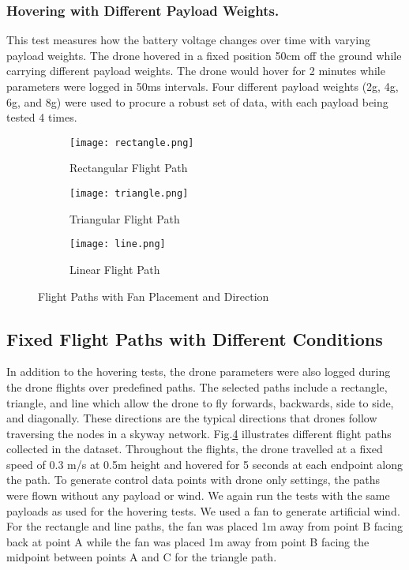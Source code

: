 \documentclass[runningheads]{llncs}
\begin{document}
\subsubsection{Hovering with Different Payload Weights.}
This test measures how the battery voltage changes over time with varying payload weights. The drone hovered in a fixed position 50cm off the ground while carrying different payload weights. The drone would hover for 2 minutes while parameters were logged in 50ms intervals. Four different payload weights (2g, 4g, 6g, and 8g) were used to procure a robust set of data, with each payload being tested 4 times.
\begin{figure}[t]
  \begin{subfigure}[t]{0.32\textwidth}
    \texttt{[image: rectangle.png]}
    \vspace{-0.4 cm}
   \caption{Rectangular Flight Path}\label{rectangle-diagram}
  \end{subfigure}\hfill
  \begin{subfigure}[t]{0.32\textwidth}
    \texttt{[image: triangle.png]}
    
   \caption{Triangular Flight Path}\label{triangle-diagram}
  \end{subfigure}
  \begin{subfigure}[t]{0.32\textwidth}
    \texttt{[image: line.png]}
    \vspace{-0.4 cm}
    \caption{Linear Flight Path}\label{line-diagram}
  \end{subfigure}
    \vspace{-0.2 cm}
  \caption{Flight Paths with Fan Placement and Direction}
  \label{fig:paths}
\vspace{-0.3 cm}
\end{figure}
\vspace{-0.2 cm}
\subsection{Fixed Flight Paths with Different Conditions}
\vspace{-0.1 cm}
In addition to the hovering tests, the drone parameters were also logged during the drone flights over predefined paths. The selected paths include a rectangle, triangle, and line which allow the drone to fly forwards, backwards, side to side, and diagonally. These directions are the typical directions that drones follow traversing the nodes in a skyway network. Fig.\ref{fig:paths} illustrates different flight paths collected in the dataset. Throughout the flights, the drone travelled at a fixed speed of 0.3 m/s at 0.5m height and hovered for 5 seconds at each endpoint along the path. To generate control data points with drone only settings, the paths were flown without any payload or wind. We again run the tests with the same payloads as used for the hovering tests. We used a fan to generate artificial wind. For the rectangle and line paths, the fan was placed 1m away from point B facing back at point A while the fan was placed 1m away from point B facing the midpoint between points A and C for the triangle path.
\vspace{-0.4 cm}
\end{document}
